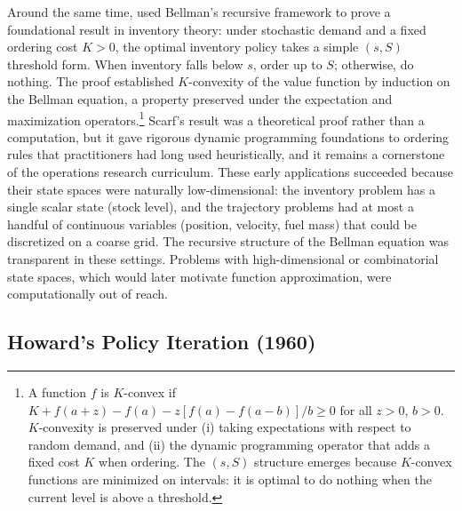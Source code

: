 Around the same time, \citet{Scarf1960} used Bellman's recursive framework to prove a foundational result in inventory theory: under stochastic demand and a fixed ordering cost $K > 0$, the optimal inventory policy takes a simple $(s, S)$ threshold form. When inventory falls below $s$, order up to $S$; otherwise, do nothing. The proof established $K$-convexity of the value function by induction on the Bellman equation, a property preserved under the expectation and maximization operators.\footnote{A function $f$ is $K$-convex if $K + f(a+z) - f(a) - z[f(a) - f(a-b)]/b \geq 0$ for all $z > 0$, $b > 0$. $K$-convexity is preserved under (i) taking expectations with respect to random demand, and (ii) the dynamic programming operator that adds a fixed cost $K$ when ordering. The $(s,S)$ structure emerges because $K$-convex functions are minimized on intervals: it is optimal to do nothing when the current level is above a threshold.} Scarf's result was a theoretical proof rather than a computation, but it gave rigorous dynamic programming foundations to ordering rules that practitioners had long used heuristically, and it remains a cornerstone of the operations research curriculum. These early applications succeeded because their state spaces were naturally low-dimensional: the inventory problem has a single scalar state (stock level), and the trajectory problems had at most a handful of continuous variables (position, velocity, fuel mass) that could be discretized on a coarse grid. The recursive structure of the Bellman equation was transparent in these settings. Problems with high-dimensional or combinatorial state spaces, which would later motivate function approximation, were computationally out of reach.

\subsection{Howard's Policy Iteration (1960)}

